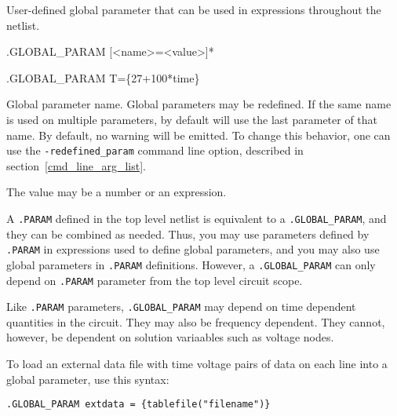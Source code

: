 

User-defined global parameter that can be used in expressions throughout the netlist.
\begin{Command}

\format
.GLOBAL\_PARAM [<name>=<value>]*

\examples
.GLOBAL\_PARAM T=\{27+100*time\}

\begin{Arguments}

Global parameter name.  Global parameters may be redefined.  
If the same name is used on multiple parameters, \Xyce{} by default will use the last parameter of that name.  
  By default, no warning will be emitted.
To change this behavior, one can use the \texttt{-redefined\_param} command line option, described in section~\ref{cmd_line_arg_list}.


The value may be a number or an expression.

\end{Arguments}

\comments

A \texttt{.PARAM} 
defined in the top level netlist is equivalent to 
a \texttt{.GLOBAL\_PARAM}, and they can be combined as needed.
Thus, you may use parameters defined by \texttt{.PARAM} in expressions used to
define global parameters, and you may also use global parameters in
\texttt{.PARAM} definitions.    However, a \texttt{.GLOBAL\_PARAM} 
  can only depend on \texttt{.PARAM} parameter from the top level circuit scope.

Like \texttt{.PARAM} parameters, \texttt{.GLOBAL\_PARAM} may
depend on time dependent quantities in the circuit.  They may also
be frequency dependent.  They cannot, however, be 
dependent on solution variaables such as voltage nodes.

To load an external data file with time voltage pairs of data on each 
line into a global parameter, use this syntax:

\texttt{.GLOBAL\_PARAM extdata = \{tablefile("filename")\}}


\end{Command}
